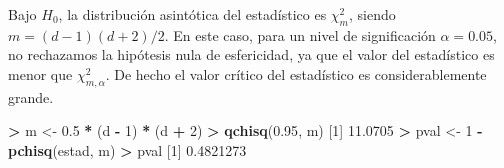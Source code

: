 \documentclass[
  a4paper,
  oneside]{scrbook}
\newenvironment{Shaded}{\begin{snugshade}}{\end{snugshade}}
\newcommand{\DecValTok}[1]{\textcolor[rgb]{0.00,0.00,0.81}{#1}}
\newcommand{\FloatTok}[1]{\textcolor[rgb]{0.00,0.00,0.81}{#1}}
\newcommand{\FunctionTok}[1]{\textcolor[rgb]{0.13,0.29,0.53}{\textbf{#1}}}
\newcommand{\NormalTok}[1]{#1}
\newcommand{\OtherTok}[1]{\textcolor[rgb]{0.56,0.35,0.01}{#1}}
\newcommand{\SpecialCharTok}[1]{\textcolor[rgb]{0.81,0.36,0.00}{\textbf{#1}}}
\theoremstyle{definition}
\theoremstyle{definition}
\theoremstyle{definition}
\theoremstyle{definition}
\theoremstyle{remark}
\begin{document}
\footnotesize

\begin{Shaded}
\end{Shaded}

\normalsize

Bajo \(H_0\), la distribución asintótica del estadístico es \(\chi_m^2\),
siendo \(m=(d-1)(d+2)/2\). En este caso, para un nivel de significación
\(\alpha=0.05\), no rechazamos la hipótesis nula de esfericidad, ya que el
valor del estadístico es menor que \(\chi_{m,\alpha}^2\). De hecho el
valor crítico del estadístico es considerablemente grande.

\footnotesize

\begin{Shaded}
\begin{Highlighting}[]
\SpecialCharTok{\textgreater{}}\NormalTok{ m }\OtherTok{\textless{}{-}} \FloatTok{0.5} \SpecialCharTok{*}\NormalTok{ (d }\SpecialCharTok{{-}} \DecValTok{1}\NormalTok{) }\SpecialCharTok{*}\NormalTok{ (d }\SpecialCharTok{+} \DecValTok{2}\NormalTok{)}
\SpecialCharTok{\textgreater{}} \FunctionTok{qchisq}\NormalTok{(}\FloatTok{0.95}\NormalTok{, m)}
\NormalTok{[}\DecValTok{1}\NormalTok{] }\FloatTok{11.0705}
\SpecialCharTok{\textgreater{}}\NormalTok{ pval }\OtherTok{\textless{}{-}} \DecValTok{1} \SpecialCharTok{{-}} \FunctionTok{pchisq}\NormalTok{(estad, m)}
\SpecialCharTok{\textgreater{}}\NormalTok{ pval}
\NormalTok{[}\DecValTok{1}\NormalTok{] }\FloatTok{0.4821273}
\end{Highlighting}
\end{Shaded}
\end{document}
